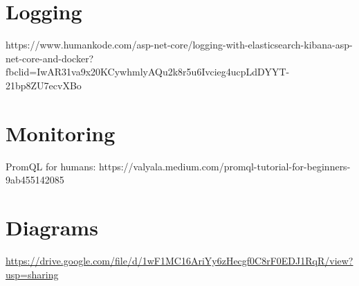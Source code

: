 \documentclass[report/main.tex]{subfiles}
\begin{document}
    \section{Logging}
        https://www.humankode.com/asp-net-core/logging-with-elasticsearch-kibana-asp-net-core-and-docker?fbclid=IwAR31va9x20KCywhmlyAQu2k8r5u6Ivcieg4ucpLdDYYT-21bp8ZU7ecvXBo
    
    \section{Monitoring}
        PromQL for humans: https://valyala.medium.com/promql-tutorial-for-beginners-9ab455142085
        
    \section{Diagrams}
        \url{https://drive.google.com/file/d/1wF1MC16AriYy6zHecgf0C8rF0EDJ1RqR/view?usp=sharing}
\end{document}

